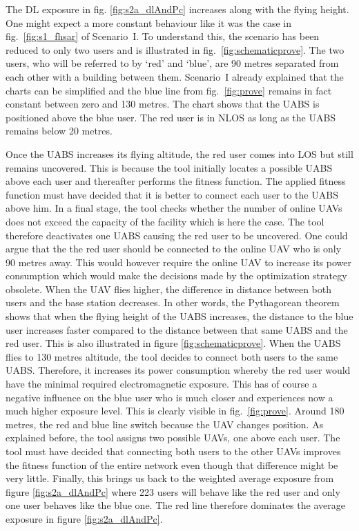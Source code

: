 The \gls{DL} exposure in fig. \ref{fig:s2a_dlAndPc} increases along with the flying height. One might expect a more constant 
behaviour like it was the case in \mbox{fig. \ref{fig:s1_fhsar}} of \mbox{Scenario I}. To understand this, the scenario has been reduced  
to only two users and is illustrated in \mbox{fig. \ref{fig:schematicprove}}.
The two users, who will be referred to by `red' and `blue', are 90 metres separated from each other with a building between them.
\mbox{Scenario I} already explained that the charts can be simplified and the blue line from \mbox{fig. \ref{fig:prove}} remains in fact constant between zero and 130 metres.
The chart shows that the \gls{UABS} is positioned above the blue user. The red user is in \gls{NLOS} as long as the \gls{UABS} remains below 20 metres.

\clearpage
Once the \gls{UABS} increases its flying altitude, the red user comes into \gls{LOS} but still remains uncovered. This is because the tool initially locates a possible 
\gls{UABS} above each user and thereafter performs the  fitness function. The applied fitness function must have decided that it is better to connect 
each user to the \gls{UABS} above him. In a final stage, the tool checks whether the number of online \gls{UAV}s does not exceed the capacity of the facility
which is here the case. The tool therefore deactivates one \gls{UABS} causing the red user to be uncovered. One could argue that the 
the red user should be connected to the online \gls{UAV} who is only 90 metres away. This would however require the online \gls{UAV} to increase its power consumption which 
would make the decisions made by the optimization strategy obsolete.
When the \gls{UAV} flies higher, the difference in distance between both users and the base station decreases. In other words, the Pythagorean theorem shows that when the flying height of the 
\gls{UABS} increases, the distance to the blue user increases faster compared to the distance between that same \gls{UABS} and the red user. This is also illustrated in 
figure \ref{fig:schematicprove}.
When the \gls{UABS} flies to 130 metres altitude, the tool decides to connect both users to the same \gls{UABS}. Therefore, it increases its power consumption whereby the red user would  have the minimal 
required electromagnetic exposure. This has of course a negative influence on the blue user who is much closer and experiences now a much higher exposure level. This is clearly visible in \mbox{fig. \ref{fig:prove}}.
Around 180 metres, the  red and blue line switch because the \gls{UAV} changes position. As explained before, the tool assigns two possible \gls{UAV}s, one above 
each user. The tool must have decided that connecting both users to the other \gls{UAV}s improves the fitness function of the entire network even though that difference might be 
very little.
Finally, this brings us back to the weighted average exposure from figure \ref{fig:s2a_dlAndPc} where 223 users will behave like the  red user and only
one user behaves like the blue one. 
The red line therefore dominates the average exposure in figure \ref{fig:s2a_dlAndPc}.

